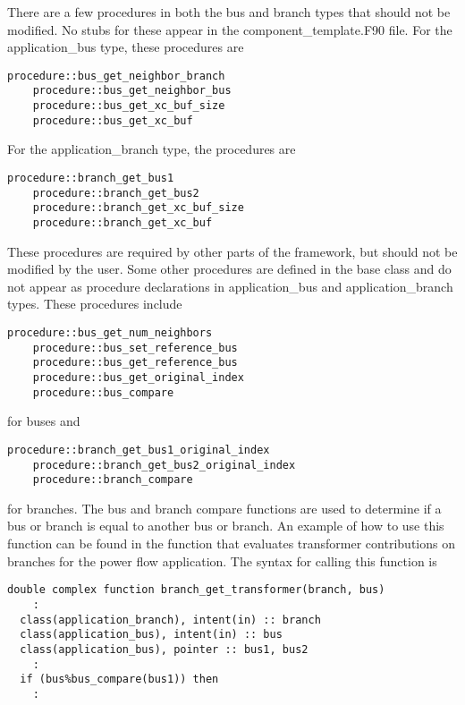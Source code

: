 There are a few procedures in both the bus and branch types that should not be modified. No stubs for these appear in the component\_template.F90 file. For the application\_bus type, these procedures are

{
\color{red}
\begin{Verbatim}[fontseries=b]
    procedure::bus_get_neighbor_branch
    procedure::bus_get_neighbor_bus
    procedure::bus_get_xc_buf_size
    procedure::bus_get_xc_buf
\end{Verbatim}
}

For the application\_branch type, the procedures are

{
\color{red}
\begin{Verbatim}[fontseries=b]
    procedure::branch_get_bus1
    procedure::branch_get_bus2
    procedure::branch_get_xc_buf_size
    procedure::branch_get_xc_buf
\end{Verbatim}
}

These procedures are required by other parts of the framework, but should not be modified by the user. Some other procedures are defined in the base class and do not appear as procedure declarations in application\_bus and application\_branch types. These procedures include

{
\color{red}
\begin{Verbatim}[fontseries=b]
    procedure::bus_get_num_neighbors
    procedure::bus_set_reference_bus
    procedure::bus_get_reference_bus
    procedure::bus_get_original_index
    procedure::bus_compare
\end{Verbatim}
}

for buses and

{
\color{red}
\begin{Verbatim}[fontseries=b]
    procedure::branch_get_bus1_original_index
    procedure::branch_get_bus2_original_index
    procedure::branch_compare
\end{Verbatim}
}

for branches. The bus and branch compare functions are used to determine if a bus or branch is equal to another bus or branch. An example of how to use this function can be found in the function that evaluates transformer contributions on branches for the power flow application. The syntax for calling this function is

{
\color{red}
\begin{Verbatim}[fontseries=b]
double complex function branch_get_transformer(branch, bus)
    :
  class(application_branch), intent(in) :: branch
  class(application_bus), intent(in) :: bus
  class(application_bus), pointer :: bus1, bus2
    :
  if (bus%bus_compare(bus1)) then
    :
\end{Verbatim}
}

